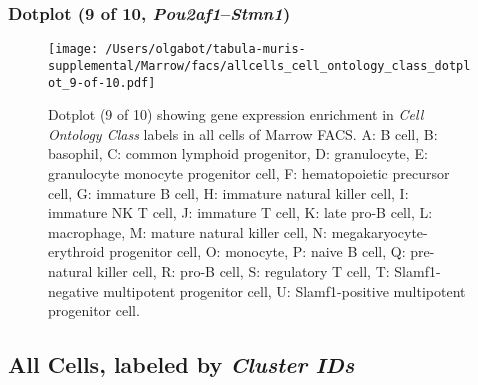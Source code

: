 \subsubsection{Dotplot (9 of 10, \emph{Pou2af1}--\emph{Stmn1})}
\begin{figure}[h]
\centering
\texttt{[image: /Users/olgabot/tabula-muris-supplemental/Marrow/facs/allcells\_cell\_ontology\_class\_dotplot\_9-of-10.pdf]}

\caption{ Dotplot (9 of 10)  showing gene expression enrichment in \emph{Cell Ontology Class} labels in all cells of Marrow FACS. A: B cell, B: basophil, C: common lymphoid progenitor, D: granulocyte, E: granulocyte monocyte progenitor cell, F: hematopoietic precursor cell, G: immature B cell, H: immature natural killer cell, I: immature NK T cell, J: immature T cell, K: late pro-B cell, L: macrophage, M: mature natural killer cell, N: megakaryocyte-erythroid progenitor cell, O: monocyte, P: naive B cell, Q: pre-natural killer cell, R: pro-B cell, S: regulatory T cell, T: Slamf1-negative multipotent progenitor cell, U: Slamf1-positive multipotent progenitor cell.}
\end{figure}


\clearpage

\subsection{All Cells, labeled by \emph{Cluster IDs}}
